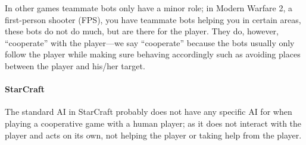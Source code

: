 In other games teammate bots only have a minor role; in Modern Warfare 2\cite{callofduty}, a first-person shooter (FPS), you have teammate bots helping you in certain areas, these bots do not do much, but are there for the player. They do, however, “cooperate” with the player—we say “cooperate” because the bots usually only follow the player while making sure behaving accordingly such as avoiding places between the player and his/her target.

\paragraph{StarCraft}
The standard AI in StarCraft probably does not have any specific AI for when playing a cooperative game with a human player; as it does not interact with the player and acts on its own, not helping the player or taking help from the player. 